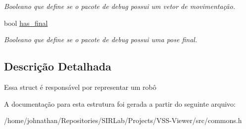 \begin{DoxyCompactItemize}
\begin{DoxyCompactList}\small\item\em Booleano que define se o pacote de debug possui um vetor de movimentação. \end{DoxyCompactList}\item 
bool \hyperlink{structcommon_1_1Robot_a53ef950d28fe6fb46c21af2c0bf5eba0}{has\+\_\+final}\hypertarget{structcommon_1_1Robot_a53ef950d28fe6fb46c21af2c0bf5eba0}{}\label{structcommon_1_1Robot_a53ef950d28fe6fb46c21af2c0bf5eba0}

\begin{DoxyCompactList}\small\item\em Booleano que define se o pacote de debug possui uma pose final. \end{DoxyCompactList}\end{DoxyCompactItemize}


\subsection{Descrição Detalhada}
Essa struct é responsável por representar um robô 

A documentação para esta estrutura foi gerada a partir do seguinte arquivo\+:\begin{DoxyCompactItemize}
\item 
/home/johnathan/\+Repositories/\+S\+I\+R\+Lab/\+Projects/\+V\+S\+S-\/\+Viewer/src/commons.\+h\end{DoxyCompactItemize}
